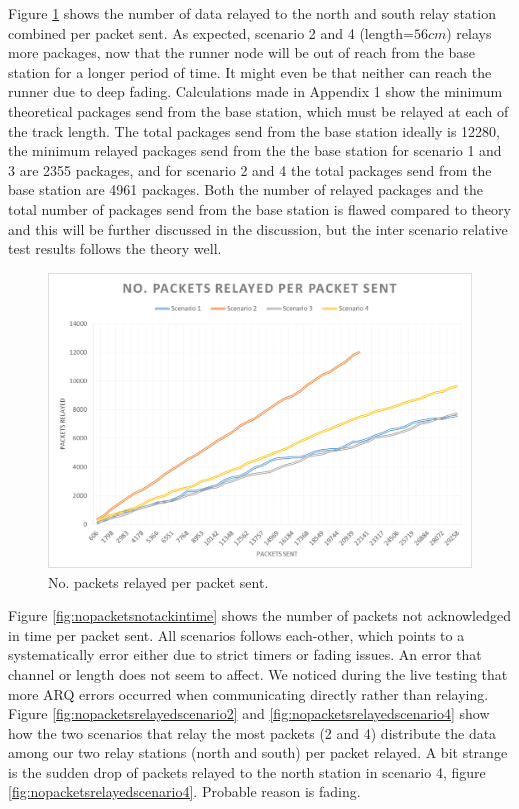 \noindent Figure \ref{fig:nopacketsrelayed} shows the number of data relayed to the north  and south relay station combined per packet sent. As expected, scenario 2 and 4 (length=$56cm$) relays more packages, now that the runner node will be out of reach from the base station for a longer period of time. It might even be that neither can reach the runner due to deep fading. Calculations made in Appendix 1 show the minimum theoretical packages send from the base station, which must be relayed at each of the track length. The total packages send from the base station ideally is 12280, the minimum relayed packages send from the the base station for scenario 1 and 3 are 2355 packages, and for scenario 2 and 4 the total packages send from the base station are 4961 packages. Both the number of relayed packages and the total number of packages send from the base station is flawed compared to theory and this will be further discussed in the discussion, but the inter scenario relative test results follows the theory well.

\begin{figure}[h]
	\centering
	\includegraphics[width=1\linewidth]{results/NoPacketsRelayed}
	\caption{No. packets relayed per packet sent.}
	\label{fig:nopacketsrelayed}
\end{figure}

\noindent Figure \ref{fig:nopacketsnotackintime} shows the number of packets not acknowledged in time per packet sent. All scenarios follows each-other, which points to a systematically error either due to strict timers or fading issues. An error that channel or length does not seem to affect. We noticed during the live testing that more ARQ errors occurred when communicating directly rather than relaying. Figure \ref{fig:nopacketsrelayedscenario2} and \ref{fig:nopacketsrelayedscenario4} show how the two scenarios that relay the most packets (2 and 4) distribute the data among our two relay stations (north and south) per packet relayed. A bit strange is the sudden drop of packets relayed to the north station in scenario 4, figure  \ref{fig:nopacketsrelayedscenario4}. Probable reason is fading.

